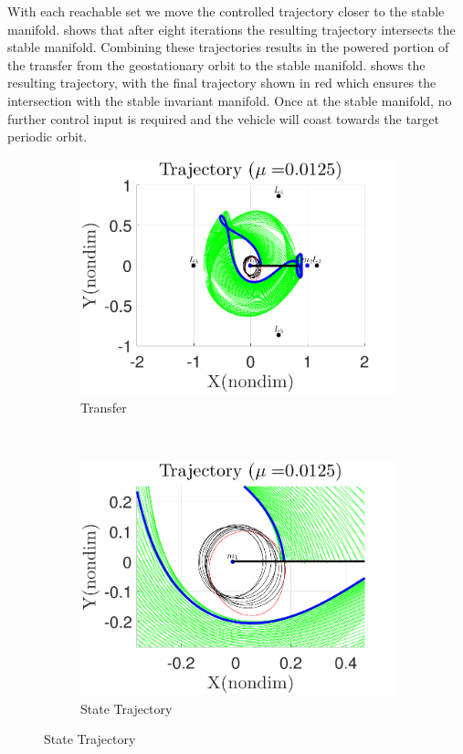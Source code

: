 \documentclass[preprint]{elsarticle}
\begin{document}
With each reachable set we move the controlled trajectory closer to the stable manifold.
 shows that after eight iterations the resulting trajectory intersects the stable manifold. 
Combining these trajectories results in the powered portion of the transfer from the geostationary orbit to the stable manifold. 
 shows the resulting trajectory, with the final trajectory shown in red which ensures the intersection with the stable invariant manifold.
Once at the stable manifold, no further control input is required and the vehicle will coast towards the target periodic orbit.
\begin{figure} 
	\centering 
	\begin{subfigure}[htbp]{0.5\textwidth} 
		\includegraphics[width=\textwidth]{geo_transfer_full} 
		\caption{Transfer} \label{fig:geo_transfer_full} 
	\end{subfigure}~ %
	\begin{subfigure}[htbp]{0.5\textwidth} 
		\includegraphics[width=\textwidth]{geo_transfer_zoom} 
		\caption{State Trajectory} \label{fig:geo_transfer_zoom} 
	\end{subfigure} 
	

\end{figure}
\end{document}
